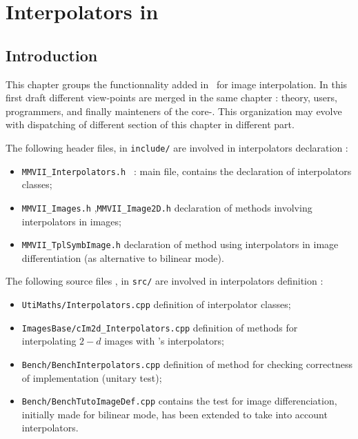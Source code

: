 


\chapter{Interpolators in \PPP}

\label{ChapInterpolators}


\section{Introduction}
This chapter groups the functionnality added in \PPP\ for image interpolation. In this
first draft different view-points are merged in the same chapter : theory, users, programmers,
and finally mainteners of the core-\PPP.  This organization may evolve with dispatching of different section
of this chapter in different part.

The following header files, in {\tt include/} are involved in interpolators declaration :

\begin{itemize}
    \item {\tt MMVII\_Interpolators.h } : main file, contains the declaration of interpolators classes;
    \item {\tt MMVII\_Images.h} ,{\tt MMVII\_Image2D.h} declaration of methods involving interpolators
          in images;

    \item {\tt MMVII\_TplSymbImage.h}  declaration of method using interpolators in image differentiation
          (as alternative to bilinear mode).
\end{itemize}

The following source  files , in {\tt src/} are involved in interpolators definition :

\begin{itemize}
   \item {\tt UtiMaths/Interpolators.cpp} definition of interpolator classes;
   \item {\tt ImagesBase/cIm2d\_Interpolators.cpp} definition of methods for interpolating $2-d$ images with
         \PPP's interpolators;
   \item {\tt Bench/BenchInterpolators.cpp}  definition of method for checking correctness of implementation
         (unitary test);

   \item {\tt Bench/BenchTutoImageDef.cpp} contains the test for image differenciation, initially made for bilinear mode,
         has been extended to take into account  interpolators.
\end{itemize}



